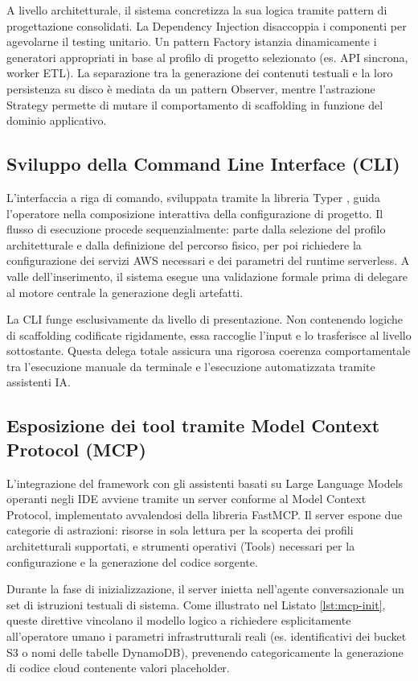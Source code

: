 A livello architetturale, il sistema concretizza la sua logica tramite pattern di progettazione consolidati. La Dependency Injection disaccoppia i componenti per agevolarne il testing unitario. Un pattern Factory istanzia dinamicamente i generatori appropriati in base al profilo di progetto selezionato (es. API sincrona, worker ETL). La separazione tra la generazione dei contenuti testuali e la loro persistenza su disco è mediata da un pattern Observer, mentre l'astrazione Strategy permette di mutare il comportamento di scaffolding in funzione del dominio applicativo.

\subsection{Sviluppo della Command Line Interface (CLI)}
L'interfaccia a riga di comando, sviluppata tramite la libreria Typer \cite{Typer}, guida l'operatore nella composizione interattiva della configurazione di progetto. Il flusso di esecuzione procede sequenzialmente: parte dalla selezione del profilo architetturale e dalla definizione del percorso fisico, per poi richiedere la configurazione dei servizi AWS necessari e dei parametri del runtime serverless. A valle dell'inserimento, il sistema esegue una validazione formale prima di delegare al motore centrale la generazione degli artefatti.

La CLI funge esclusivamente da livello di presentazione. Non contenendo logiche di scaffolding codificate rigidamente, essa raccoglie l'input e lo trasferisce al livello sottostante. Questa delega totale assicura una rigorosa coerenza comportamentale tra l'esecuzione manuale da terminale e l'esecuzione automatizzata tramite assistenti IA.

\subsection{Esposizione dei tool tramite Model Context Protocol (MCP)}
L'integrazione del framework con gli assistenti basati su Large Language Models operanti negli IDE avviene tramite un server conforme al Model Context Protocol, implementato avvalendosi della libreria FastMCP. Il server espone due categorie di astrazioni: risorse in sola lettura per la scoperta dei profili architetturali supportati, e strumenti operativi (Tools) necessari per la configurazione e la generazione del codice sorgente.

Durante la fase di inizializzazione, il server inietta nell'agente conversazionale un set di istruzioni testuali di sistema. Come illustrato nel Listato \ref{lst:mcp-init}, queste direttive vincolano il modello logico a richiedere esplicitamente all'operatore umano i parametri infrastrutturali reali (es. identificativi dei bucket S3 o nomi delle tabelle DynamoDB), prevenendo categoricamente la generazione di codice cloud contenente valori placeholder.

